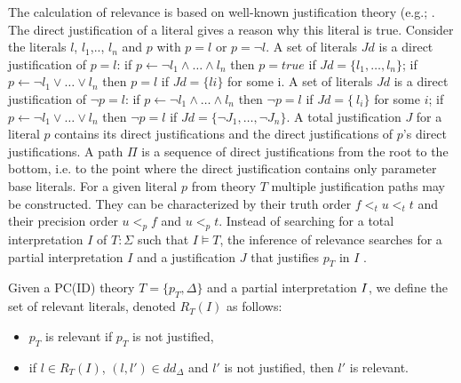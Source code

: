 The calculation of relevance is based on well-known justification theory (e.g.; \cite{Denecker93, Denecker2015}.
The direct justification of a literal gives a reason why this literal is true.
Consider the literals $l$, $l_1$,.., $l_n$ and $p$ with $p=l$ or $p=\neg l$.
A set of literals $Jd$ is a direct justification of $p = l$:
if $p \leftarrow \neg l_1 \wedge \ldots \wedge l_n$ then $p = true$ if $Jd = \{l_1, \ldots ,l_n\}$;
if $p \leftarrow \neg l_1 \vee \ldots \vee l_n$ then $p=l$ if $Jd = \{li\}$ for some i.
A set of literals $Jd$ is a direct justification of $\neg p = l$:
if $p \leftarrow \neg l_1 \wedge \ldots \wedge l_n$ then $\neg p = l$ if $Jd = \{~l_i\}$ for some $i$;  
if $p \leftarrow \neg l_1 \vee \ldots \vee l_n$ then $\neg p = l$ if $Jd = \{\neg J_1,  \ldots , \neg J_n\}$.
A total justification $J$ for a literal $p$ contains its direct justifications and the direct justifications of $p$'s direct justifications.
A path $\Pi$ is a sequence of direct justifications from the root to the bottom, i.e. to the point where the direct justification contains only parameter base literals.
For a given literal $p$ from theory $T$ multiple justification paths may be constructed.
They can be characterized by their truth order $f <_t u <_t t$ and their precision order  $u<_p f$ and $u<_p t$.
Instead of searching for a total interpretation $I$ of $T:\Sigma$ such that $I \models T$, the inference of relevance searches for a partial interpretation $I$ and a justification $J$ that justifies $p_T$ in $I$ \cite{Jansen2016}.
\begin{definition}
\label{def1}
\cite{Jansen2016}
Given a PC(ID) theory $T = \{p_T , \Delta \}$ and a partial interpretation $I$, we define the set of relevant literals, denoted $R_T(I)$ as follows:
\begin{itemize}
    \item $p_T$ is relevant if $p_T$ is not justified,
    \item if $l \in R_T(I)$, $(l,l') \in dd_\Delta$ and $l'$ is not justified, then $l'$ is relevant.
\end{itemize}
\end{definition}


